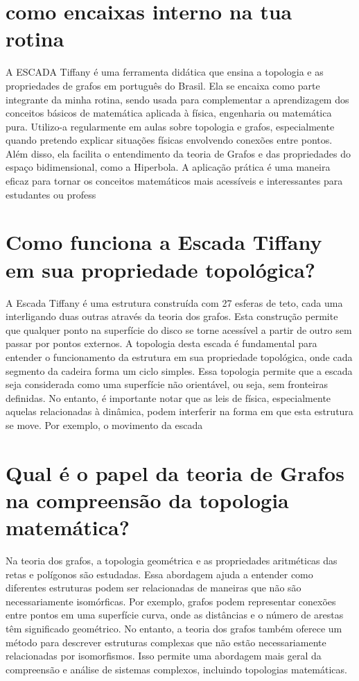 \documentclass[11pt,a4paper]{article}
\begin{document}
\section{como encaixas interno na tua rotina}
A ESCADA Tiffany é uma ferramenta didática que ensina a topologia e as propriedades de grafos em português do Brasil. Ela se encaixa como parte integrante da minha rotina, sendo usada para complementar a aprendizagem dos conceitos básicos de matemática aplicada à física, engenharia ou matemática pura. Utilizo-a regularmente em aulas sobre topologia e grafos, especialmente quando pretendo explicar situações físicas envolvendo conexões entre pontos. Além disso, ela facilita o entendimento da teoria de Grafos e das propriedades do espaço bidimensional, como a Hiperbola. A aplicação prática é uma maneira eficaz para tornar os conceitos matemáticos mais acessíveis e interessantes para estudantes ou profess

\section{Como funciona a Escada Tiffany em sua propriedade topológica?}
A Escada Tiffany é uma estrutura construída com 27 esferas de teto, cada uma interligando duas outras através da teoria dos grafos. Esta construção permite que qualquer ponto na superfície do disco se torne acessível a partir de outro sem passar por pontos externos. A topologia desta escada é fundamental para entender o funcionamento da estrutura em sua propriedade topológica, onde cada segmento da cadeira forma um ciclo simples. Essa topologia permite que a escada seja considerada como uma superfície não orientável, ou seja, sem fronteiras definidas. No entanto, é importante notar que as leis de física, especialmente aquelas relacionadas à dinâmica, podem interferir na forma em que esta estrutura se move. Por exemplo, o movimento da escada

\section{Qual é o papel da teoria de Grafos na compreensão da topologia matemática?}
Na teoria dos grafos, a topologia geométrica e as propriedades aritméticas das retas e polígonos são estudadas. Essa abordagem ajuda a entender como diferentes estruturas podem ser relacionadas de maneiras que não são necessariamente isomórficas. Por exemplo, grafos podem representar conexões entre pontos em uma superfície curva, onde as distâncias e o número de arestas têm significado geométrico. No entanto, a teoria dos grafos também oferece um método para descrever estruturas complexas que não estão necessariamente relacionadas por isomorfismos. Isso permite uma abordagem mais geral da compreensão e análise de sistemas complexos, incluindo topologias matemáticas.
\end{document}
